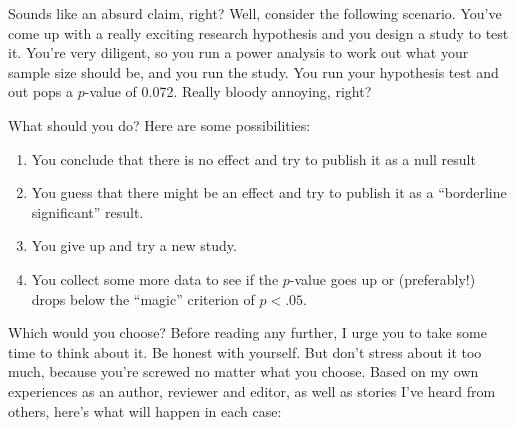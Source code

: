 \documentclass[
  a4paper,
]{book}
\providecommand{\tightlist}{%
  \setlength{\itemsep}{0pt}\setlength{\parskip}{0pt}}\usepackage{longtable,booktabs,array}
\begin{document}
Sounds like an absurd claim, right? Well, consider the following
scenario. You've come up with a really exciting research hypothesis and
you design a study to test it. You're very diligent, so you run a power
analysis to work out what your sample size should be, and you run the
study. You run your hypothesis test and out pops a \(p\)-value of 0.072.
Really bloody annoying, right?

What should you do? Here are some possibilities:

\begin{enumerate}
\def\labelenumi{\arabic{enumi}.}
\tightlist
\item
  You conclude that there is no effect and try to publish it as a null
  result
\item
  You guess that there might be an effect and try to publish it as a
  ``borderline significant'' result.
\item
  You give up and try a new study.
\item
  You collect some more data to see if the \(p\)-value goes up or
  (preferably!) drops below the ``magic'' criterion of \(p < .05\).
\end{enumerate}

Which would you choose? Before reading any further, I urge you to take
some time to think about it. Be honest with yourself. But don't stress
about it too much, because you're screwed no matter what you choose.
Based on my own experiences as an author, reviewer and editor, as well
as stories I've heard from others, here's what will happen in each case:
\end{document}
